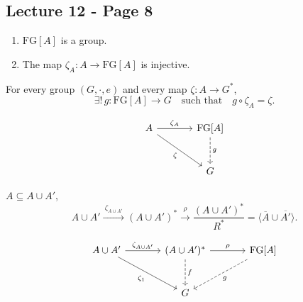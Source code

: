 
\subsection*{Lecture 12 - Page 8}

\noindent{}
\begin{enumerate}
\item[(1)] $\mathrm{FG}[A]$ is a group.
\item[(2)] The map $\zeta_A:A\longrightarrow\mathrm{FG}[A]$
is injective.
\end{enumerate}

\medskip
\noindent For every group $(G,\cdot,e)$ and every map
$\zeta:A\longrightarrow G^*$,
\[
\exists!\,g:\mathrm{FG}[A]\longrightarrow G
\quad\text{such that}\quad g\circ\zeta_A=\zeta.
\]

\[
\begin{tikzcd}[column sep=large, row sep=large]
A \arrow[r,"\zeta_A"] \arrow[dr,"\zeta"']
  & \mathrm{FG}[A] \arrow[d,dashed,"g"]\\
& G
\end{tikzcd}
\]

\medskip
\noindent $A\subseteq A\cup A'$,
\[
A\cup A'\xrightarrow{\ \zeta_{A\cup A'}\ }(A\cup A')^*
\xrightarrow{\ \rho\ }
\frac{(A\cup A')^*}{R^*}
=\langle\overline{A}\cup\overline{A'}\rangle.
\]

\[
\begin{tikzcd}[column sep=large, row sep=large]
A\cup A' \arrow[r,"\zeta_{A\cup A'}"] \arrow[dr,"\zeta_1"']
  & (A\cup A')^* \arrow[r,"\rho"] \arrow[d,dashed,"f"]
  & \mathrm{FG}[A] \arrow[dl,dashed,"g"]\\
& G &
\end{tikzcd}
\]

